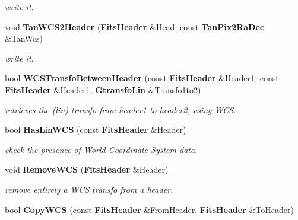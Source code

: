 \begin{CompactItemize}
\begin{CompactList}\small\item\em write it.\item\end{CompactList}\item 
{}
void {\bf Tan\-WCS2Header} ({\bf Fits\-Header} \&Head, const {\bf Tan\-Pix2Ra\-Dec} \&Tan\-Wcs)\label{wcsutils_h_a9}

\begin{CompactList}\small\item\em write it.\item\end{CompactList}\item 
{}
bool {\bf WCSTransfo\-Between\-Header} (const {\bf Fits\-Header} \&Header1, const {\bf Fits\-Header} \&Header1, {\bf Gtransfo\-Lin} \&Transfo1to2)\label{wcsutils_h_a10}

\begin{CompactList}\small\item\em retrieves the (lin) transfo from header1 to header2, using WCS.\item\end{CompactList}\item 
{}
bool {\bf Has\-Lin\-WCS} (const {\bf Fits\-Header} \&Header)\label{wcsutils_h_a11}

\begin{CompactList}\small\item\em check the presence of World Coordinate System data.\item\end{CompactList}\item 
{}
void {\bf Remove\-WCS} ({\bf Fits\-Header} \&Header)\label{wcsutils_h_a12}

\begin{CompactList}\small\item\em remove entirely a WCS transfo from a header.\item\end{CompactList}\item 
{}
bool {\bf Copy\-WCS} (const {\bf Fits\-Header} \&From\-Header, {\bf Fits\-Header} \&To\-Header)\label{wcsutils_h_a13}


\end{CompactItemize}
